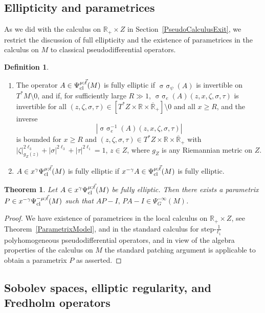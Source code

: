 \documentclass[reqno]{amsart}
\numberwithin{equation}{section}
\newtheorem{theorem}[equation]{Theorem}
\theoremstyle{definition}
\newtheorem{definition}[equation]{Definition}
\def\R{\mathbb R}
\DeclareMathOperator{\sym}{ \sigma\!\!\!\sigma}
\begin{document}
\subsection{Ellipticity and parametrices}

As we did with the calculus on $\R_+\times Z$ in Section~\ref{PseudoCalculusExit}, we restrict the discussion of full ellipticity and the existence of parametrices in the calculus on $M$ to classical pseudodifferential operators.

\begin{definition}
\begin{enumerate}
\item The operator $A \in \Psi^{\mu;\vec{\ell}}_{\textup{cl}}(M)$ is fully elliptic if $\sym_{\psi}(A)$ is invertible on $T^*M\setminus 0$, and if, for sufficiently large $R \gg 1$, $\sym_e(A)(z,x,\zeta,\sigma,\tau)$ is invertible for all $(z,\zeta,\sigma,\tau) \in [T^*Z \times \R \times \overline{\R}_+] \setminus 0$ and all $x \geq R$, and the inverse
$$
|\sym^{-1}_e(A)(z,x,\zeta,\sigma,\tau)|
$$
is bounded for $x \geq R$ and $(z,\zeta,\sigma,\tau) \in T^*Z \times \R \times \overline{\R}_+$ with $|\zeta|_{g_Z(z)}^{2\ell_3} + |\sigma|^{2\ell_3} + |\tau|^{2\ell_1} = 1$, $z \in Z$, where $g_Z$ is any Riemannian metric on $Z$.
\item $A \in x^{\gamma}\Psi^{\mu;\vec{\ell}}_{\textup{cl}}(M)$ is fully elliptic if $x^{-\gamma}A \in \Psi^{\mu;\vec{\ell}}_{\textup{cl}}(M)$ is fully elliptic.
\end{enumerate}
\end{definition}

\begin{theorem}\label{Parametrix}
Let $A \in x^{\gamma}\Psi^{\mu;\vec{\ell}}_{\textup{cl}}(M)$ be fully elliptic. Then there exists a parametrix $P \in x^{-\gamma}\Psi^{-\mu;\vec{\ell}}_{\textup{cl}}(M)$ such that $AP-I,\, PA - I \in \Psi^{-\infty}_G(M)$.
\end{theorem}
\begin{proof}
We have existence of parametrices in the local calculus on ${\mathbb R}_+\times Z$, see Theorem~\ref{ParametrixModel}, and in the standard calculus for step-$\frac{1}{\ell_1}$ polyhomogeneous pseudodifferential operators, and in view of the algebra properties of the calculus on $M$ the standard patching argument is applicable to obtain a parametrix $P$ as asserted.
\end{proof}

\subsection{Sobolev spaces, elliptic regularity, and Fredholm operators}
\end{document}
